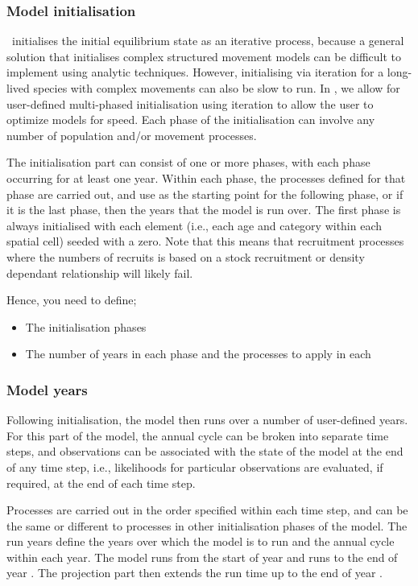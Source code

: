 \subsubsection{Model initialisation}

\SPM\ initialises the initial equilibrium state as an iterative process, because a general solution that initialises complex structured movement models can be difficult to implement using analytic techniques. However, initialising via iteration for a long-lived species with complex movements can also be slow to run. In \SPM, we allow for user-defined multi-phased initialisation using iteration to allow the user to optimize models for speed. Each phase of the initialisation can involve any number of population and/or movement processes. 

The initialisation part can consist of one or more phases, with each phase occurring for at least one year. Within each phase, the processes defined for that phase are carried out, and use as the starting point for the following phase, or if it is the last phase, then the years that the model is run over. The first phase is always initialised with each element (i.e., each age and category within each spatial cell) seeded with a zero. Note that this means that recruitment processes where the numbers of recruits is based on a stock recruitment or density dependant relationship will likely fail. 

Hence, you need to define;
\begin{itemize}
  \item The initialisation phases
  \item The number of years in each phase and the processes to apply in each
\end{itemize}

\subsubsection{Model years}

Following initialisation, the model then runs over a number of user-defined years. For this part of the model, the annual cycle can be broken into separate time steps, and observations can be associated with the state of the model at the end of any time step, i.e., likelihoods for particular observations are evaluated, if required, at the end of each time step. 

Processes are carried out in the order specified within each time step, and can be the same or different to processes in other initialisation phases of the model. The run years define the years over which the model is to run and the annual cycle within each year. The model runs from the start of year  and runs to the end of year . The projection part then extends the run time up to the end of year . 

